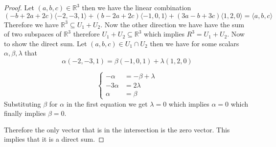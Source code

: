 \documentclass[letter,12pt]{article}
\newcommand{\R}{\mathbb{R}}
\begin{document}
\begin{proof}

  Let $(a,b,c)\in \mathbb{R}^3$ then we have the linear combination \[(-b+2a+2c)\langle -2,-3,1\rangle+(b-2a+2c)\langle -1,0,1\rangle+(3a-b+3c)\langle 1,2,0 \rangle=\langle a,b,c\rangle\]
  Therefore we have $\mathbb{R}^3\subseteq U_1+ U_2$. Now the other direction we have have the sum of two subspaces of $\R^3$ therefore $U_1+U_2\subseteq \mathbb{R}^3$ which implies $R^3=U_1+U_2$. 
  Now to show the direct sum. Let $(a,b,c)\in U_1\cap U_2$ then we have for some scalars $\alpha, \beta, \lambda$ that 
  \[
  \alpha(-2,-3,1) =\beta(-1,0,1)+\lambda(1,2,0)
  \]
  

  \begin{equation*}
    \left\{
      \begin{aligned}
       -\alpha &=-\beta +\lambda \\
       -3\alpha &=2\lambda \\
      \alpha &=\beta
      \end{aligned}
    \right.
  \end{equation*}
  Substituting $\beta $ for $\alpha$ in the first equation we get $\lambda =0$ which implies $\alpha=0$ which finally implies $\beta=0$.
  
  Therefore the only vector that is in the intersection is the zero vector. This implies that it is a direct sum. 


\end{proof}
\end{document}
